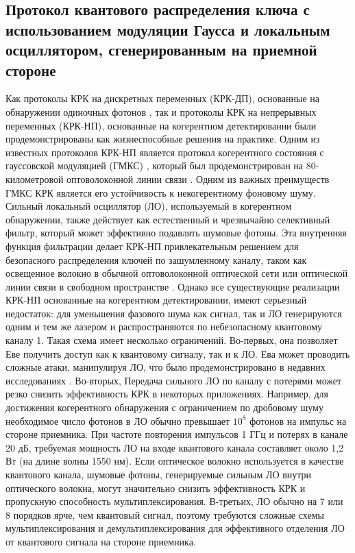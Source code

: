 \subsection{Протокол квантового распределения ключа с использованием модуляции Гаусса и локальным осциллятором, сгенерированным на приемной стороне}\label{sec:ch1/sect4/subsec2} %
Как протоколы КРК на дискретных переменных  (КРК-ДП), основанные на обнаружении одиночных фотонов \cite{bennett1984,ekert1991}, так и протоколы КРК на непрерывных переменных (КРК-НП), основанные на когерентном детектировании \cite{ralph1999,hillery2000,grosshans2002} были продемонстрированы как жизнеспособные решения на практике. Одним из известных протоколов КРК-НП является протокол когерентного состояния с гауссовской модуляцией (ГМКС) \cite{grosshans2002}, который был продемонстрирован на 80-километровой оптоволоконной  линии связи \cite{jouguet2013a}. Одним из важных преимуществ ГМКС КРК  является его устойчивость к некогерентному фоновому шуму. Сильный локальный осциллятор (ЛО), используемый в когерентном обнаружении, также действует как естественный и чрезвычайно селективный фильтр, который может эффективно подавлять шумовые фотоны. Эта внутренняя функция фильтрации делает КРК-НП привлекательным решением для безопасного распределения ключей по зашумленному каналу, таком как освещенное волокно в обычной оптоволоконной оптической сети \cite{kumar2015} или оптической линии связи в свободном пространстве \cite{heim2014}.
Однако все существующие реализации КРК-НП основанные на когерентном детектировании, имеют серьезный недостаток: для уменьшения фазового шума как сигнал, так и ЛО генерируются одним и тем же лазером и распространяются по небезопасному квантовому каналу \cite{grosshans2002, jouguet2013a, heim2014} 1. Такая схема имеет несколько ограничений. Во-первых, она позволяет Еве получить доступ как к квантовому сигналу, так и к ЛО. Ева может проводить сложные атаки, манипулируя ЛО, что было продемонстрировано в недавних исследованиях \cite{ma2013, huang2013,jouguet2013}. Во-вторых, Передача сильного ЛО по каналу с потерями может резко снизить эффективность КРК в некоторых приложениях. Например, для достижения когерентного обнаружения с ограничением по дробовому шуму необходимое число фотонов в ЛО обычно превышает $10^8$ фотонов на импульс на стороне приемника. При частоте повторения импульсов 1 ГГц и потерях в канале 20 дБ, требуемая мощность ЛО на входе квантового канала составляет около 1,2 Вт (на длине волны 1550 нм). Если оптическое волокно используется в качестве квантового канала, шумовые фотоны, генерируемые сильным ЛО внутри оптического волокна, могут значительно снизить эффективность КРК и пропускную способность мультиплексирования. В-третьих, ЛО обычно на 7 или 8 порядков ярче, чем квантовый сигнал, поэтому требуются сложные схемы мультиплексирования и демультиплексирования для эффективного отделения ЛО от квантового сигнала на стороне приемника.
